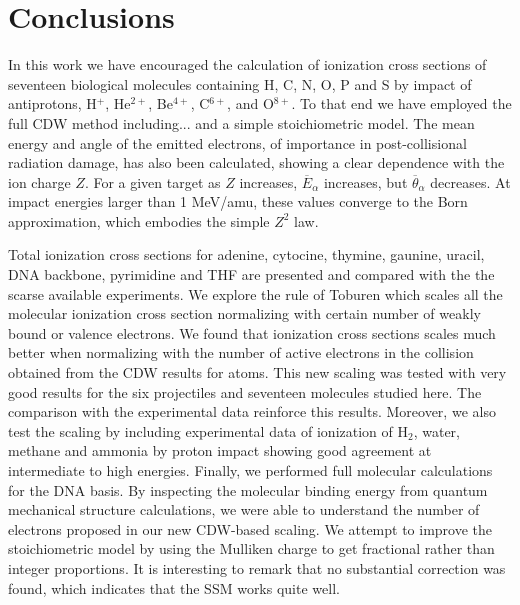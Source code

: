 \documentclass[preprint]{revtex4-2}
\begin{document}
\section{Conclusions}

In this work we have encouraged the calculation of ionization cross 
sections of seventeen biological molecules containing H, C, N, O, P and 
S by impact of antiprotons, H$^{+}$, He$^{2+}$, Be$^{4+}$, C$^{6+}$, 
and O$^{8+}$. 
To that end we have employed the full CDW method including... and a 
simple stoichiometric model. 
The mean energy and angle of the emitted electrons, of importance in 
post-collisional radiation damage,  has also been calculated, showing 
a clear dependence with the ion charge $Z$. For a given target as $Z$ 
increases, $\overline{E}_{\alpha}$
increases, but $\overline{\theta}_{\alpha}$ decreases. At impact
energies larger than 1 MeV/amu, these values converge to the Born
approximation, which embodies the simple $Z^{2}$ law. 

Total ionization cross sections for adenine, cytocine, thymine, gaunine, 
uracil, DNA backbone, pyrimidine and THF are presented and compared 
with the the scarse available experiments. We explore the rule of 
Toburen which scales
all the molecular ionization cross section normalizing with certain 
number of
weakly bound or valence electrons. We found that ionization cross 
sections scales much better when normalizing with the number of active 
electrons in the collision obtained from the CDW results for atoms. 
This new scaling was tested with very good results for the six 
projectiles and seventeen molecules studied here. The comparison with 
the experimental data reinforce this results. Moreover, we also test 
the scaling by including experimental data of ionization of H$_2$, 
water, methane and ammonia by proton impact showing good agreement at
intermediate to high energies.
Finally, we performed full molecular calculations for the DNA basis. 
By inspecting the molecular binding energy from quantum mechanical
structure calculations, we were able to understand the number of 
electrons proposed in our new CDW-based scaling. We attempt to improve 
the stoichiometric model by using the Mulliken charge to get fractional
rather than integer proportions. It is interesting to remark that no 
substantial
correction was found, which indicates that the SSM works quite well.
\end{document}
